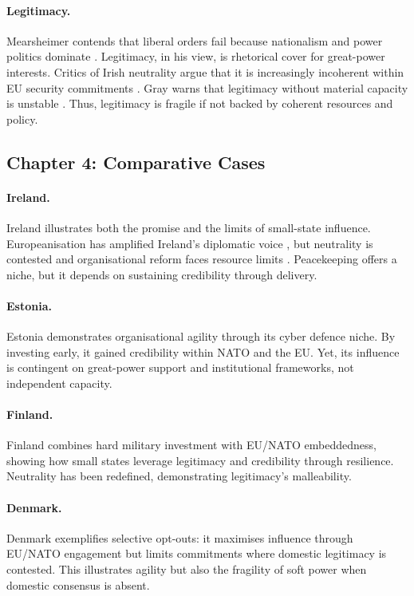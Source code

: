 \paragraph{Legitimacy.}  
Mearsheimer contends that liberal orders fail because nationalism and power politics dominate \parencite{MEARSHEIMER_2019}. Legitimacy, in his view, is rhetorical cover for great-power interests. Critics of Irish neutrality argue that it is increasingly incoherent within EU security commitments \parencite{WHITE_2015}. Gray warns that legitimacy without material capacity is unstable \parencite{GRAY_2018}. Thus, legitimacy is fragile if not backed by coherent resources and policy.

\subsection*{Chapter 4: Comparative Cases}
\paragraph{Ireland.}  
Ireland illustrates both the promise and the limits of small-state influence. Europeanisation has amplified Ireland’s diplomatic voice \parencite{TONRA_1999}, but neutrality is contested and organisational reform faces resource limits \parencite{HLAP_2022, DOD_2025}. Peacekeeping offers a niche, but it depends on sustaining credibility through delivery.

\paragraph{Estonia.}  
Estonia demonstrates organisational agility through its cyber defence niche. By investing early, it gained credibility within NATO and the EU. Yet, its influence is contingent on great-power support and institutional frameworks, not independent capacity.

\paragraph{Finland.}  
Finland combines hard military investment with EU/NATO embeddedness, showing how small states leverage legitimacy and credibility through resilience. Neutrality has been redefined, demonstrating legitimacy’s malleability.

\paragraph{Denmark.}  
Denmark exemplifies selective opt-outs: it maximises influence through EU/NATO engagement but limits commitments where domestic legitimacy is contested. This illustrates agility but also the fragility of soft power when domestic consensus is absent.

